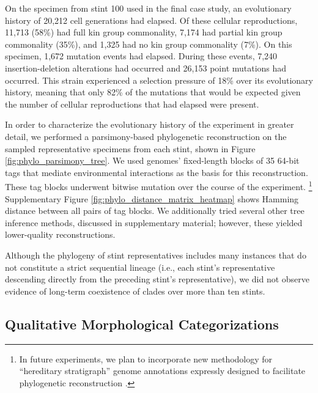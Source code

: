 On the specimen from stint 100 used in the final case study, an evolutionary history of 20,212 cell generations had elapsed.
Of these cellular reproductions, 11,713 (58\%) had full kin group commonality, 7,174 had partial kin group commonality (35\%), and 1,325 had no kin group commonality (7\%).
On this specimen, 1,672 mutation events had elapsed.
During these events, 7,240 insertion-deletion alterations had occurred and 26,153 point mutations had occurred.
This strain experienced a selection pressure of 18\% over its evolutionary history, meaning that only 82\% of the mutations that would be expected given the number of cellular reproductions that had elapsed were present.



In order to characterize the evolutionary history of the experiment in greater detail, we performed a parsimony-based phylogenetic reconstruction on the sampled representative specimens from each stint, shown in Figure \ref{fig:phylo_parsimony_tree}.
We used genomes' fixed-length blocks of 35 64-bit tags that mediate environmental interactions as the basis for this reconstruction.
These tag blocks underwent bitwise mutation over the course of the experiment.%
\footnote{
In future experiments, we plan to incorporate new methodology for ``hereditary stratigraph'' genome annotations expressly designed to facilitate phylogenetic reconstruction .
}
Supplementary Figure \ref{fig:phylo_distance_matrix_heatmap} shows Hamming distance between all pairs of tag blocks.
We additionally tried several other tree inference methods, discussed in supplementary material; however, these yielded lower-quality reconstructions.

Although the phylogeny of stint representatives includes many instances that do not constitute a strict sequential lineage (i.e., each stint's representative descending directly from the preceding stint's representative), we did not observe evidence of long-term coexistence of clades over more than ten stints.

\subsection{Qualitative Morphological Categorizations}

